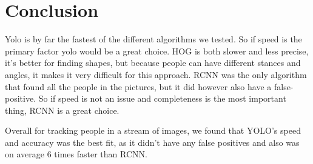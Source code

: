 \section{Conclusion}
Yolo is by far the fastest of the different algorithms we tested. So if speed is the primary factor yolo would be a great choice. HOG is both slower and less precise, it’s better for finding shapes, but because people can have different stances and angles, it makes it very difficult for this approach.
RCNN was the only algorithm that found all the people in the pictures, but it did however also have a false-positive. So if speed is not an issue and completeness is the most important thing, RCNN is a great choice.

Overall for tracking people in a stream of images, we found that YOLO’s speed and accuracy was the best fit, as it didn't have any false positives and also was on average 6 times faster than RCNN.

